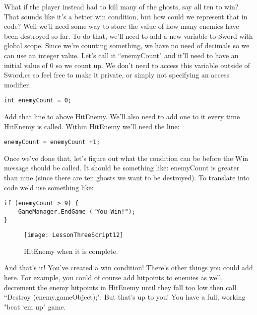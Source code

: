 \documentclass{article}
\begin{document}
\noindent{}

What if the player instead had to kill many of the ghosts, say all ten to win? That sounds like it's a better win condition, but how could we represent that in code? Well we'll need some way to store the value of how many enemies have been destroyed so far. To do that, we'll need to add a new variable to Sword with global scope. Since we're counting something, we have no need of decimals so we can use an integer value. Let's call it ``enemyCount" and it'll need to have an initial value of 0 so we count up. We don't need to access this variable outside of Sword.cs so feel free to make it private, or simply not specifying an access modifier.

\lstset{style=sharpc}
\begin{lstlisting}
int enemyCount = 0;
\end{lstlisting}

Add that line to above HitEnemy. We'll also need to add one to it every time HitEnemy is called. Within HitEnemy we'll need the line: 

\lstset{style=sharpc}
\begin{lstlisting}
enemyCount = enemyCount +1;
\end{lstlisting}

Once we've done that, let's figure out what the condition can be before the Win message should be called. It should be something like: enemyCount is greater than nine (since there are ten ghosts we want to be destroyed). To translate into code we'd use something like: 

\lstset{style=sharpc}
\begin{lstlisting}
if (enemyCount > 9) {
	GameManager.EndGame ("You Win!");
}
\end{lstlisting}

\begin{figure}
  \texttt{[image: LessonThreeScript12]}
  \caption{HitEnemy when it is complete.}
  \label{fig:LessonThreeScript12}
\end{figure}

\noindent{}

And that's it! You've created a win condition! There's other things you could add here. For example, you could of course add hitpoints to enemies as well, decrement the enemy hitpoints in HitEnemy until they fall too low then call ``Destroy (enemy.gameObject);". But that's up to you! You have a full, working "beat `em up" game. 
\end{document}
